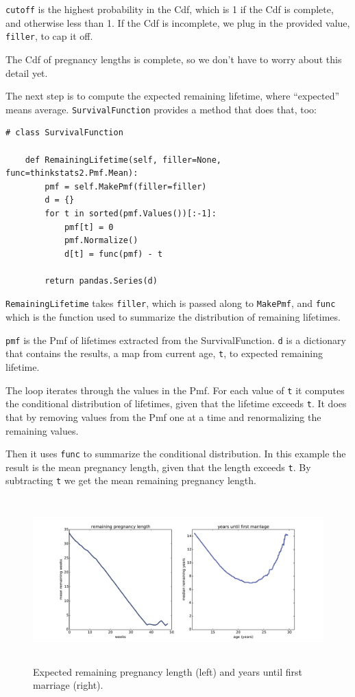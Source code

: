 \documentclass[12pt]{book}
\begin{document}
{\tt cutoff} is the highest probability in the Cdf, which is 1
if the Cdf is complete, and otherwise less than 1.  
If the Cdf is incomplete, we plug in the provided value, {\tt filler},
to cap it off.

The Cdf of pregnancy lengths is complete, so we don't have to worry
about this detail yet.

The next step is to compute the expected remaining lifetime, where
``expected'' means average.  {\tt SurvivalFunction}
provides a method that does that, too:

\begin{verbatim}
# class SurvivalFunction

    def RemainingLifetime(self, filler=None, func=thinkstats2.Pmf.Mean):
        pmf = self.MakePmf(filler=filler)
        d = {}
        for t in sorted(pmf.Values())[:-1]:
            pmf[t] = 0
            pmf.Normalize()
            d[t] = func(pmf) - t

        return pandas.Series(d)
\end{verbatim}

{\tt RemainingLifetime} takes {\tt filler}, which is passed along
to {\tt MakePmf}, and {\tt func} which is the function used to
summarize the distribution of remaining lifetimes.

{\tt pmf} is the Pmf of lifetimes extracted from the SurvivalFunction.
{\tt d} is a dictionary that contains the results, a map from
current age, {\tt t}, to expected remaining lifetime.

The loop iterates through the values in the Pmf.  For each value
of {\tt t} it computes the conditional distribution of lifetimes,
given that the lifetime exceeds {\tt t}.  It does that by removing
values from the Pmf one at a time and renormalizing the remaining
values.

Then it uses {\tt func} to summarize the conditional distribution.
In this example the result is the mean pregnancy length, given that
the length exceeds {\tt t}.  By subtracting {\tt t} we get the
mean remaining pregnancy length.

\begin{figure}
\centerline{\includegraphics[height=2.5in]{figs/survival6.pdf}}
\caption{Expected remaining pregnancy length (left) and
years until first marriage (right).}
\label{survival6}
\end{figure}
\end{document}
